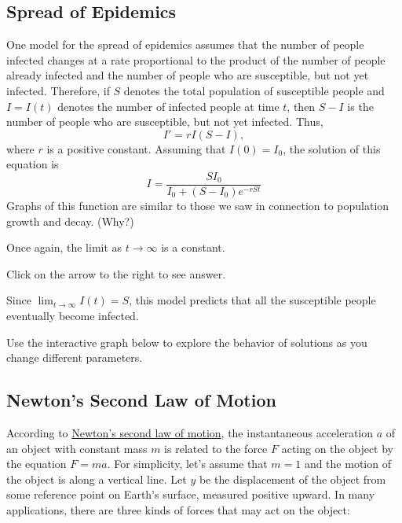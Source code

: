 \documentclass{ximera}
\begin{document}
\subsection*{Spread of Epidemics}
 
One model for the spread of epidemics assumes that the number of
people infected changes at a rate proportional to the product of the
number of people already infected and the number of people who are
susceptible, but not yet infected. Therefore, if $S$ denotes the
total population of susceptible people and $I=I(t)$ denotes the
number
of infected people at time $t$, then $S-I$ is the number of people
who are susceptible, but not yet infected. Thus,
$$
I'=rI(S-I),
$$
where $r$ is a positive constant. Assuming that $I(0)=I_0$,
the solution of this equation is
$$
I=\frac{SI_0}{I_0+(S-I_0)e^{-rSt}}
$$
 Graphs of this function are similar to those we saw in connection to population growth and decay.
(Why?)

\begin{solution}
Once again, the limit as $t \rightarrow \infty$ is a constant.
 \end{solution}
 
 Click on the arrow to the right to see answer.

Since $\lim_{t\to\infty}I(t)=S$, this model predicts that all the
susceptible people eventually become infected.

Use the interactive graph below to explore the behavior of solutions as you change different parameters.
 
\begin{center}  
\end{center}

 
\subsection*{Newton's Second Law of Motion}
 
According to
\href{http://www-history.mcs.st-and.ac.uk/Mathematicians/Newton.html}{Newton's second law of motion},  the
instantaneous acceleration
$a$ of an object with constant mass $m$ is related to the force $F$
acting on the object by the equation $F=ma$. For simplicity, let's
assume that $m=1$ and the motion of the object is along a vertical
line. Let $y$ be the displacement of the object from some reference
point on Earth's surface, measured positive upward. In many
applications, there are three kinds of forces that may act on the
object:
 
\end{document}
